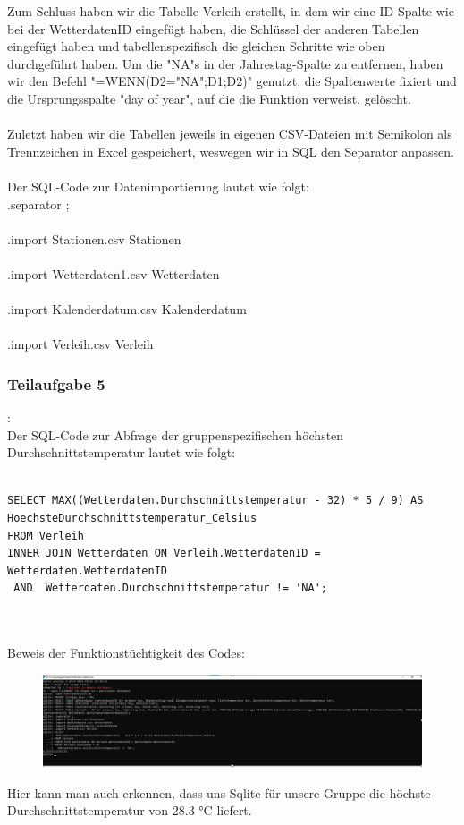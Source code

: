 \documentclass[a4paper,12pt]{article}
\begin{document}
Zum Schluss haben wir die Tabelle Verleih erstellt, in dem wir eine ID-Spalte wie bei der WetterdatenID eingefügt haben, die Schlüssel der anderen Tabellen eingefügt haben und tabellenspezifisch die gleichen Schritte wie oben durchgeführt haben. Um die "NA"s in der Jahrestag-Spalte zu entfernen, haben wir den Befehl "=WENN(D2="NA";D1;D2)" genutzt, die Spaltenwerte fixiert und die Ursprungsspalte "day of year", auf die die Funktion verweist, gelöscht.\\ \\
Zuletzt haben wir die Tabellen jeweils in eigenen CSV-Dateien mit Semikolon als Trennzeichen in Excel gespeichert, weswegen wir in SQL den Separator anpassen.\\ \\

\noindent Der SQL-Code zur Datenimportierung lautet wie folgt: \\ 

\noindent .separator ; \\ \\
.import Stationen.csv Stationen\\ \\
.import Wetterdaten1.csv Wetterdaten \\ \\
.import Kalenderdatum.csv Kalenderdatum \\ \\
.import Verleih.csv Verleih \\ 

\subsubsection{Teilaufgabe 5}: \\ Der SQL-Code zur Abfrage der gruppenspezifischen höchsten Durchschnittstemperatur lautet wie folgt:\\ \\
\begin{lstlisting}
SELECT MAX((Wetterdaten.Durchschnittstemperatur - 32) * 5 / 9) AS  HoechsteDurchschnittstemperatur_Celsius
FROM Verleih 
INNER JOIN Wetterdaten ON Verleih.WetterdatenID = Wetterdaten.WetterdatenID
 AND  Wetterdaten.Durchschnittstemperatur != 'NA'; 
 \end{lstlisting}
\\ \\
\noindent Beweis der Funktionstüchtigkeit des Codes: 
\begin{figure}[H]
    \centering
    \includegraphics[width=\textwidth]{image.png}

    \label{fig:enter-label}
\end{figure}
\noindent Hier kann man auch erkennen, dass uns Sqlite für unsere Gruppe die höchste Durchschnittstemperatur von 28.3 °C liefert.
\end{document}
